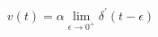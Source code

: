 \begin{equation}
\label{time-coupl}
v(t) = \alpha \lim_{\epsilon \rightarrow 0^+} \delta^{\prime}(t - \epsilon)
\end{equation}

